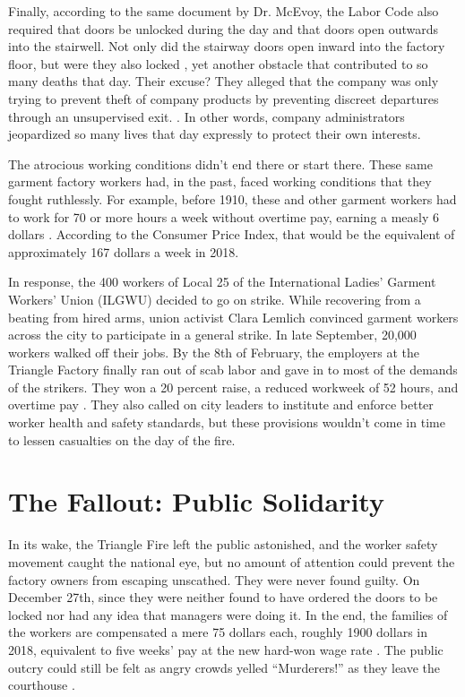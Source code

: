 \documentclass[12pt]{article}
\begin{document}
Finally, according to the same document by Dr. McEvoy, the Labor Code also
required that doors be unlocked during the day and that doors open outwards into
the stairwell. Not only did the stairway doors open inward into the factory
floor, but were they also locked \parencite[628]{Ev1995}, yet another obstacle
that contributed to so many deaths that day. Their excuse? They alleged that the
company was only trying to prevent theft of company products by preventing
discreet departures through an unsupervised exit. \parencite{Ev1995}. In other
words, company administrators jeopardized so many lives that day expressly to
protect their own interests.

The atrocious working conditions didn't end there or start there. These same
garment factory workers had, in the past, faced working conditions that they
fought ruthlessly. For example, before 1910, these and other garment workers had
to work for 70 or more hours a week without overtime pay, earning a measly 6
dollars \parencite{von2004triangle}. According to the Consumer Price Index, that
would be the equivalent of approximately 167 dollars a week in 2018.

In response, the 400 workers of Local 25 of the International Ladies' Garment
Workers' Union (ILGWU) decided to go on strike. While recovering from a beating
from hired arms, union activist Clara Lemlich convinced garment workers
across the city to participate in a general strike. In late September, 20,000
workers walked off their jobs. By the 8th of February, the employers at the
Triangle Factory finally ran out of scab labor
and gave in to most of the demands of the strikers. They won a 20 percent raise,
a reduced workweek of 52 hours, and overtime pay \parencite{von2004triangle}.
They also called on city leaders to institute and enforce better worker health
and safety standards, but these provisions wouldn't come in time to lessen
casualties on the day of the fire.


\section{The Fallout: Public Solidarity}

In its wake, the Triangle Fire left the public astonished, and the worker safety
movement caught the national eye, but no amount of attention could prevent the
factory owners from escaping unscathed. They were never found guilty. On December
27th, since they were neither found to have ordered the doors to be locked nor
had any idea that managers were doing it. In the end, the families of the
workers are compensated a mere 75 dollars each, roughly 1900 dollars in 2018,
equivalent to five weeks' pay at the new hard-won wage rate
\parencite[9]{robinson2018crimes}. The public outcry could still be felt as
angry crowds yelled ``Murderers!'' as they leave the courthouse
\parencite[9]{robinson2018crimes}.
\end{document}

